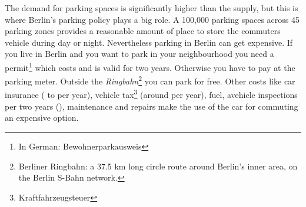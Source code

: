 The demand for parking spaces is significantly higher than the supply, but this is where Berlin's parking policy plays a big role. A 100,000 parking spaces across 45 parking zones provides a reasonable amount of place to store the commuters vehicle during day or night. Nevertheless parking in Berlin can get expensive. If you live in Berlin and you want to park in your neighbourhood you need a permit\footnote{In German: Bewohnerparkausweis} which costs  and is valid for two years. Otherwise you have to pay at the parking meter. Outside the \textit{Ringbahn}\footnote{Berliner Ringbahn: a 37.5 km long circle route around Berlin's inner area, on the Berlin S-Bahn network.} you can park for free. Other costs like car insurance ( to  per year), vehicle tax\footnote{Kraftfahrzeugsteuer} (around  per year), fuel, avehicle inspections per two years (), maintenance and repairs make the use of the car for commuting an expensive option\cite{CostCars}.
